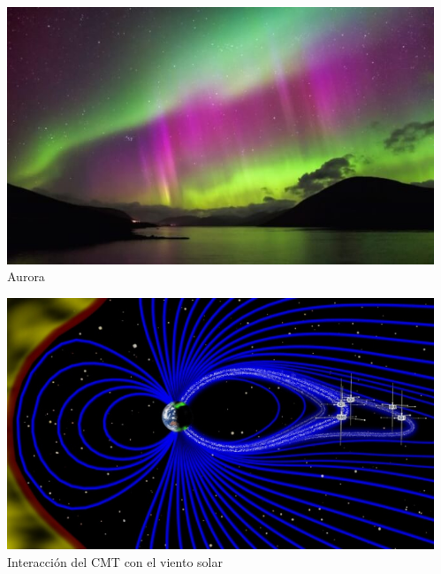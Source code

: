 \begin{frame}
  \begin{columns}
    \begin{column}{0.40\textwidth} \centering
      \includegraphics[width=\textwidth]{05.instrumentos.giroscopicos.imagenes/05.04.MagnetismoTerrestre/05-04-auroras.jpg}\vspace{0.3mm}
      Aurora \vspace{0.6mm}

	\includegraphics[width=\textwidth]{05.instrumentos.giroscopicos.imagenes/05.04.MagnetismoTerrestre/05-04-cola-del-campo-magnetico.jpeg}\vspace{0.3mm}
      Interacci\'on del CMT con el viento solar \vspace{0.6mm}

\end{column}
    \begin{column}{0.40\textwidth}


\end{column}
\end{columns}
\end{frame}
